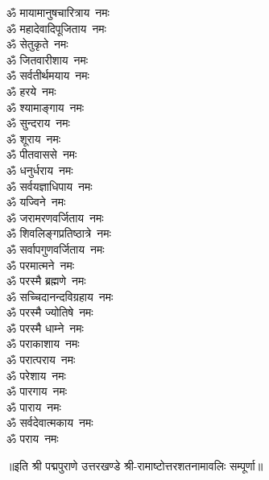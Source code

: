 \begin{multicols}{2}
\begin{flushleft}
ॐ मायामानुषचारित्राय~नमः\\
ॐ महादेवादिपूजिताय~नमः\\
ॐ सेतुकृते~नमः\\
ॐ जितवारीशाय~नमः\\
ॐ सर्वतीर्थमयाय~नमः\\
ॐ हरये~नमः\\
ॐ श्यामाङ्गाय~नमः\\
ॐ सुन्दराय~नमः\\
ॐ शूराय~नमः\\
ॐ पीतवाससे~नमः\hfill{}\\
ॐ धनुर्धराय~नमः\\
ॐ सर्वयज्ञाधिपाय~नमः\\
ॐ यज्विने~नमः\\
ॐ जरामरणवर्जिताय~नमः\\
ॐ शिवलिङ्गप्रतिष्ठात्रे~नमः\\
ॐ सर्वापगुणवर्जिताय~नमः\\
ॐ परमात्मने~नमः\\
ॐ परस्मै ब्रह्मणे~नमः\\
ॐ सच्चिदानन्दविग्रहाय~नमः\\
ॐ परस्मै ज्योतिषे~नमः\hfill{}\\
ॐ परस्मै धाम्ने~नमः\\
ॐ पराकाशाय~नमः\\
ॐ परात्पराय~नमः\\
ॐ परेशाय~नमः\\
ॐ पारगाय~नमः\\
ॐ पाराय~नमः\\
ॐ सर्वदेवात्मकाय~नमः\\
ॐ पराय~नमः\\
\end{flushleft}
\end{multicols}
॥इति श्री पद्मपुराणे उत्तरखण्डे श्री-रामाष्टोत्तरशतनामावलिः सम्पूर्णा॥
